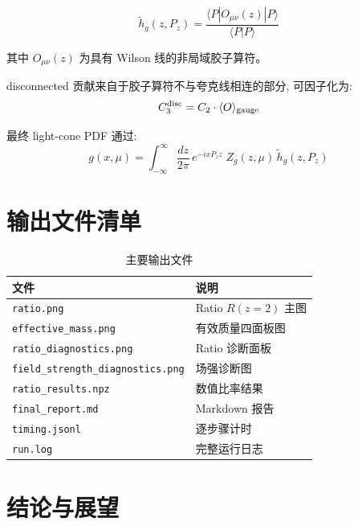 \documentclass[12pt,a4paper]{ctexart}
\begin{document}
\begin{equation}
  \tilde{h}_g(z, P_z) = \frac{
    \langle P | O_{\mu\nu}(z) | P \rangle
  }{
    \langle P | P \rangle
  }
\end{equation}

其中 $O_{\mu\nu}(z)$ 为具有 Wilson 线的非局域胶子算符。

disconnected 贡献来自于胶子算符不与夸克线相连的部分, 可因子化为:
\begin{equation}
  C_3^{\rm disc} = C_2 \cdot \langle O \rangle_{\rm gauge}
\end{equation}

最终 light-cone PDF 通过:
\begin{equation}
  g(x, \mu) = \int_{-\infty}^{\infty} \frac{dz}{2\pi} \, e^{-ixP_z z} \;
  Z_g(z, \mu) \, \tilde{h}_g(z, P_z)
\end{equation}

\section{输出文件清单}

\begin{table}[htbp]
\centering
\caption{主要输出文件}
\label{tab:output}
\begin{tabular}{ll}
\toprule
\textbf{文件} & \textbf{说明} \\
\midrule
\texttt{ratio.png}                      & Ratio $R(z{=}2)$ 主图 \\
\texttt{effective\_mass.png}            & 有效质量四面板图 \\
\texttt{ratio\_diagnostics.png}         & Ratio 诊断面板 \\
\texttt{field\_strength\_diagnostics.png}& 场强诊断图 \\
\texttt{ratio\_results.npz}             & 数值比率结果 \\
\texttt{final\_report.md}               & Markdown 报告 \\
\texttt{timing.jsonl}                   & 逐步骤计时 \\
\texttt{run.log}                        & 完整运行日志 \\
\bottomrule
\end{tabular}
\end{table}

\section{结论与展望}
\end{document}
